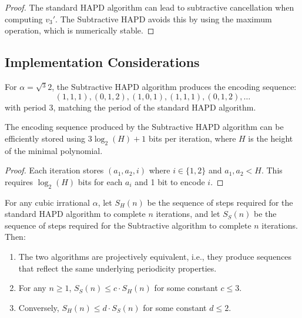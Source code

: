 \begin{proof}
The standard HAPD algorithm can lead to subtractive cancellation when computing $v_3'$. The Subtractive HAPD avoids this by using the maximum operation, which is numerically stable.
\end{proof}

\subsection{Implementation Considerations}

\begin{example}\label{ex:cube_root_implementation}
For $\alpha = \sqrt{^3}{2}$, the Subtractive HAPD algorithm produces the encoding sequence:
\begin{equation}
(1,1,1), (0,1,2), (1,0,1), (1,1,1), (0,1,2), \ldots
\end{equation}
with period 3, matching the period of the standard HAPD algorithm.
\end{example}

\begin{proposition}\label{prop:storage_efficiency}
The encoding sequence produced by the Subtractive HAPD algorithm can be efficiently stored using $3\log_2(H) + 1$ bits per iteration, where $H$ is the height of the minimal polynomial.
\end{proposition}

\begin{proof}
Each iteration stores $(a_1, a_2, i)$ where $i \in \{1,2\}$ and $a_1, a_2 < H$. This requires $\log_2(H)$ bits for each $a_i$ and 1 bit to encode $i$.
\end{proof}

\begin{lemma}\label{lem:hapd_subtractive}
For any cubic irrational $\alpha$, let $S_H(n)$ be the sequence of steps required for the standard HAPD algorithm to complete $n$ iterations, and let $S_S(n)$ be the sequence of steps required for the Subtractive algorithm to complete $n$ iterations. Then:

\begin{enumerate}
\item The two algorithms are projectively equivalent, i.e., they produce sequences that reflect the same underlying periodicity properties.
\item For any $n \geq 1$, $S_S(n) \leq c \cdot S_H(n)$ for some constant $c \leq 3$.
\item Conversely, $S_H(n) \leq d \cdot S_S(n)$ for some constant $d \leq 2$.
\end{enumerate}
\end{lemma}


